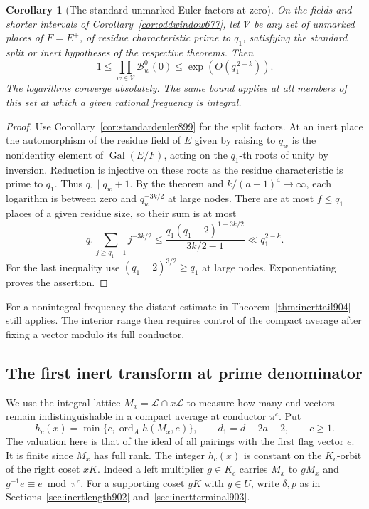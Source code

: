 \documentclass[a4paper,11pt]{article}
\newtheorem{corollary}[proposition]{Corollary}
\theoremstyle{definition}
\theoremstyle{remark}
\numberwithin{equation}{section}
\begin{document}
\begin{corollary}[The standard unmarked Euler factors at zero]
\leavevmode\label{cor:inertproduct905}
On the fields and shorter intervals of
Corollary~\ref{cor:oddwindow677}, let \(\mathcal V\) be any set of
unmarked places of \(F=E^+\), of residue characteristic prime
to \(q_1\), satisfying the standard split or inert hypotheses
of the respective theorems. Then
\[
                  1\le\prod_{w\in\mathcal V}\mathcal B^0_w(0)
                               \le\exp(O(q_1^{\,2-k})).
\]
The logarithms converge absolutely. The same bound applies
at all members of this set at which a given rational frequency
is integral.
\end{corollary}
\begin{proof}
Use Corollary~\ref{cor:standardeuler899} for the split factors.
At an inert place the automorphism of the residue field of
\(E\) given by raising to \(q_w\) is the nonidentity element of
\(\operatorname{Gal}(E/F)\), acting on the \(q_1\)-th roots of
unity by inversion. Reduction is injective on these roots as
the residue characteristic is prime to \(q_1\). Thus
\(q_1\mid q_w+1\). By the theorem and \(k/(a+1)^4\to\infty\),
each logarithm is between zero and \(q_w^{-3k/2}\) at large
nodes. There are at most \(f\le q_1\) places of a given residue
size, so their sum is at most
\[
             q_1\sum_{j\ge q_1-1}j^{-3k/2}
                 \le \frac{q_1(q_1-2)^{1-3k/2}}{3k/2-1}
                 \ll q_1^{2-k}.
\]
For the last inequality use \((q_1-2)^{3/2}\ge q_1\) at large
nodes. Exponentiating proves the assertion.
\end{proof}

For a nonintegral frequency the distant estimate in
Theorem~\ref{thm:inerttail904} still applies. The interior
range then requires control of the compact average after
fixing a vector modulo its full conductor.
\clearpage

\subsection{The first inert transform at prime denominator}
\label{sec:inertprime906}

We use the integral lattice \(M_x=\mathcal L\cap x\mathcal L\)
to measure how many end vectors remain indistinguishable in a
compact average at conductor \(\pi^c\). Put
\[
  h_c(x)=\min\{c,\operatorname{ord}_A h(M_x,e)\},
             \qquad d_1=d-2a-2,\qquad c\ge1.
\]
The valuation here is that of the ideal of all pairings with the
first flag vector \(e\). It is finite since \(M_x\) has full rank.
The integer \(h_c(x)\) is constant on the \(K_c\)-orbit of the
right coset \(xK\). Indeed a left multiplier \(g\in K_c\)
carries \(M_x\) to \(gM_x\) and \(g^{-1}e\equiv e\bmod\pi^c\).
For a supporting coset \(yK\) with \(y\in U\), write \(\delta,p\)
as in Sections~\ref{sec:inertlength902} and~\ref{sec:inertterminal903}.
\end{document}
